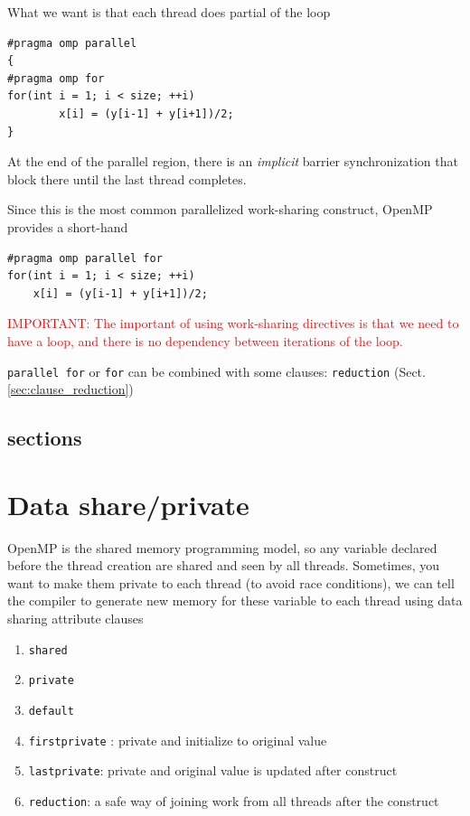 What we want is that each thread does partial of the loop
\begin{verbatim}
#pragma omp parallel    
{
#pragma omp for
for(int i = 1; i < size; ++i)
        x[i] = (y[i-1] + y[i+1])/2;
}
\end{verbatim}
At the end of the parallel region, there is an {\it implicit} barrier
synchronization  that block there until the last thread completes.

Since this is the most common parallelized work-sharing construct, OpenMP
provides a short-hand 
\begin{verbatim}
#pragma omp parallel for
for(int i = 1; i < size; ++i)
    x[i] = (y[i-1] + y[i+1])/2;
\end{verbatim}

\textcolor{red}{IMPORTANT: The important of using work-sharing directives is
that we need to have a loop, and there is no dependency between iterations of
the loop.}


\verb!parallel for! or \verb!for! can be combined with some clauses:
\verb!reduction! (Sect.\ref{sec:clause_reduction})


\subsection{sections}
\label{sec:directive_sections}

\section{Data share/private}

OpenMP is the shared memory programming model, so any variable declared before
the thread creation are shared and seen by all threads. Sometimes, you want to
make them private to each thread (to avoid race conditions), we can tell the
compiler to generate new memory for these variable to each thread using data
sharing attribute clauses

\begin{enumerate}
  \item \verb!shared!
  \item \verb!private!
  \item \verb!default!
  \item \verb!firstprivate! : private and initialize to original value
  \item \verb!lastprivate!: private and original value is updated after
  construct
  \item \verb!reduction!: a safe way of joining work from all threads after the
  construct
\end{enumerate}

